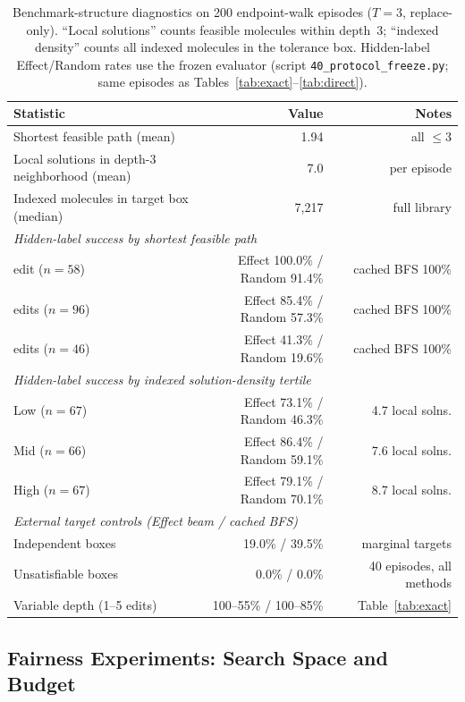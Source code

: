 \documentclass[journal=jcisd8,manuscript=article,email=false]{achemso}
\begin{document}
\begin{table}[t]
\caption{Benchmark-structure diagnostics on 200 endpoint-walk episodes ($T{=}3$, replace-only). ``Local solutions'' counts feasible molecules within depth~3; ``indexed density'' counts all indexed molecules in the tolerance box. Hidden-label Effect/Random rates use the frozen evaluator (script \texttt{40\_protocol\_freeze.py}; same episodes as Tables~\ref{tab:exact}--\ref{tab:direct}).}
\label{tab:benchmark_diag}
\centering
\small
\begin{tabular}{lrr}
\toprule
Statistic & Value & Notes \\
\midrule
Shortest feasible path (mean) & 1.94 & all $\leq 3$ \\
Local solutions in depth-3 neighborhood (mean) & 7.0 & per episode \\
Indexed molecules in target box (median) & 7{,}217 & full library \\
\midrule
\multicolumn{3}{l}{\textit{Hidden-label success by shortest feasible path}} \\
\quad 1 edit ($n{=}58$) & Effect 100.0\% / Random 91.4\% & cached BFS 100\% \\
\quad 2 edits ($n{=}96$) & Effect 85.4\% / Random 57.3\% & cached BFS 100\% \\
\quad 3 edits ($n{=}46$) & Effect 41.3\% / Random 19.6\% & cached BFS 100\% \\
\midrule
\multicolumn{3}{l}{\textit{Hidden-label success by indexed solution-density tertile}} \\
\quad Low ($n{=}67$) & Effect 73.1\% / Random 46.3\% & 4.7 local solns. \\
\quad Mid ($n{=}66$) & Effect 86.4\% / Random 59.1\% & 7.6 local solns. \\
\quad High ($n{=}67$) & Effect 79.1\% / Random 70.1\% & 8.7 local solns. \\
\midrule
\multicolumn{3}{l}{\textit{External target controls (Effect beam / cached BFS)}} \\
\quad Independent boxes & 19.0\% / 39.5\% & marginal targets \\
\quad Unsatisfiable boxes & 0.0\% / 0.0\% & 40 episodes, all methods \\
\quad Variable depth (1--5 edits) & 100--55\% / 100--85\% & Table~\ref{tab:exact} \\
\bottomrule
\end{tabular}
\end{table}

\subsection{Fairness Experiments: Search Space and Budget}
\label{sec:fairness}
\end{document}
